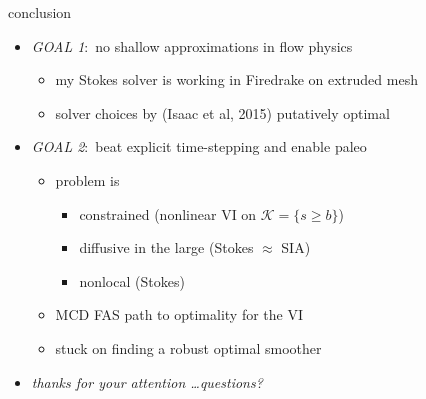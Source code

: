 \documentclass[usepdftitle=false,usenames,dvipsnames]{beamer}
\begin{document}
\begin{frame}{conclusion}

\begin{itemize}
\item \emph{GOAL 1}:\, no shallow approximations in flow physics {\Large \strut} 
    \begin{itemize}
    \item<2-3> my Stokes solver is working in Firedrake on extruded mesh
    \item<2-3> solver choices by (Isaac et al, 2015) putatively optimal
    \end{itemize}
\item \emph{GOAL 2}:\, beat explicit time-stepping and enable paleo {\Large \strut} 
    \begin{itemize}
    \item<2-3> problem is
        \begin{itemize}
        \item<2-3>[{\color{black} $\circ$}] constrained (nonlinear VI on $\mathcal{K} = \{s\ge b\}$)
        \item<2-3>[{\color{black} $\circ$}] diffusive in the large (Stokes $\approx$ SIA)
        \item<2-3>[{\color{black} $\circ$}] nonlocal (Stokes)
        \end{itemize}
    \item<2-3> {\color{ForestGreen} MCD FAS path to optimality for the VI}
    \item<3> \alert{stuck on finding a robust optimal smoother}
    \end{itemize}

\normalsize
\bigskip\bigskip
\item<3> \emph{thanks for your attention \dots questions?}
\end{itemize}
\end{frame}



\end{document}
